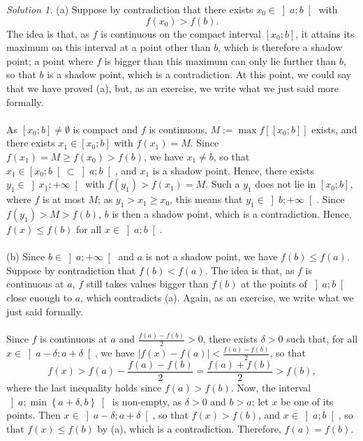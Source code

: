 \begin{solution}
    \textit{Solution 1.}
    (a) Suppose by contradiction that there exists \( x_0 \in \left]a;b\right[ \) with
    \[
        f\left(x_0\right) > f\left(b\right).
    \]
    The idea is that, as \( f \) is continuous on the compact interval \( \left[x_0;b\right] \), it attains its maximum on this interval at a point other than \( b \), which is therefore a shadow point; a point where \( f \) is bigger than this maximum can only lie further than \( b \), so that \( b \) is a shadow point, which is a contradiction. At this point, we could say that we have proved (a), but, as an exercise, we write what we just said more formally.
    \\\\
    As \( \left[x_0;b\right] \neq \emptyset \) is compact and \( f \) is continuous, \( M := \max f\left[\left[x_0;b\right]\right] \) exists, and there exists \( x_1 \in \left[x_0;b\right] \) with \( f\left(x_1\right) = M \). Since \( f\left(x_1\right) = M \geq f\left(x_0\right) > f\left(b\right) \), we have \( x_1 \neq b \), so that \( x_1 \in \left[x_0;b\right[ \subset \left]a;b\right[ \), and \( x_1 \) is a shadow point. Hence, there exists \( y_1 \in \left]x_1;+\infty\right[ \) with \( f\left(y_1\right) > f\left(x_1\right) = M \). Such a \( y_1 \) does not lie in \( \left[x_0;b\right] \), where \( f \) is at most \( M \); as \( y_1 > x_1 \geq x_0 \), this means that \( y_1 \in \left]b;+\infty\right[ \). Since \( f\left(y_1\right) > M > f\left(b\right) \), \( b \) is then a shadow point, which is a contradiction. Hence, \( f\left(x\right) \leq f\left(b\right) \) for all \( x \in \left]a;b\right[ \).
    \\\\
    (b) Since \( b \in \left]a;+\infty\right[ \) and \( a \) is not a shadow point, we have \( f\left(b\right) \leq f\left(a\right) \). Suppose by contradiction that \( f\left(b\right) < f\left(a\right) \). The idea is that, as \( f \) is continuous at \( a \), \( f \) still takes values bigger than \( f\left(b\right) \) at the points of \( \left]a;b\right[ \) close enough to \( a \), which contradicts (a). Again, as an exercise, we write what we just said formally.
    \\\\
    Since \( f \) is continuous at \( a \) and \( \frac{f\left(a\right)-f\left(b\right)}{2} > 0 \), there exists \( \delta > 0 \) such that, for all \( x \in \left]a-\delta;a+\delta\right[ \), we have \( \left|f\left(x\right)-f\left(a\right)\right| < \frac{f\left(a\right)-f\left(b\right)}{2} \), so that
    \[
        f\left(x\right) > f\left(a\right)-\frac{f\left(a\right)-f\left(b\right)}{2} = \frac{f\left(a\right)+f\left(b\right)}{2} > f\left(b\right),
    \]
    where the last inequality holds since \( f\left(a\right) > f\left(b\right) \). Now, the interval \( \left]a;\min\left\{a+\delta, b\right\}\right[ \) is non-empty, as \( \delta > 0 \) and \( b > a \); let \( x \) be one of its points. Then \( x \in \left]a-\delta;a+\delta\right[ \), so that \( f\left(x\right) > f\left(b\right) \), and \( x \in \left]a;b\right[ \), so that \( f\left(x\right) \leq f\left(b\right) \) by (a), which is a contradiction. Therefore, \( f\left(a\right) = f\left(b\right) \).


\end{solution}

